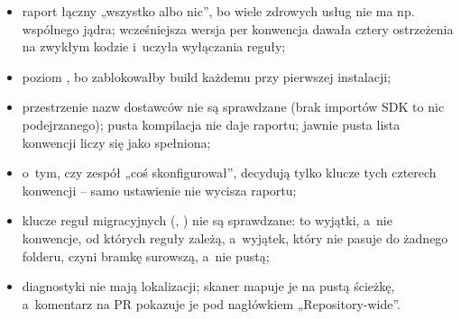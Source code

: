 \begin{itemize}[leftmargin=*]
  \item raport łączny „wszystko albo nic”, bo wiele zdrowych usług nie ma np. wspólnego
        jądra; wcześniejsza wersja per konwencja dawała cztery ostrzeżenia na zwykłym kodzie
        i~uczyła wyłączania reguły;
  \item poziom , bo  zablokowałby build każdemu przy
        pierwszej instalacji;
  \item przestrzenie nazw dostawców nie są sprawdzane (brak importów SDK to nic
        podejrzanego); pusta kompilacja nie daje raportu; jawnie pusta lista konwencji
        liczy się jako spełniona;
  \item o~tym, czy zespół „coś skonfigurował”, decydują tylko klucze tych czterech
        konwencji -- samo ustawienie  nie wycisza raportu;
  \item klucze reguł migracyjnych (,
        ) nie są sprawdzane: to wyjątki, a~nie konwencje,
        od których reguły zależą, a~wyjątek, który nie pasuje do żadnego folderu, czyni
        bramkę surowszą, a~nie pustą;
  \item diagnostyki nie mają lokalizacji; skaner mapuje je na pustą ścieżkę, a~komentarz na
        PR pokazuje je pod nagłówkiem „Repository-wide”.
\end{itemize}

